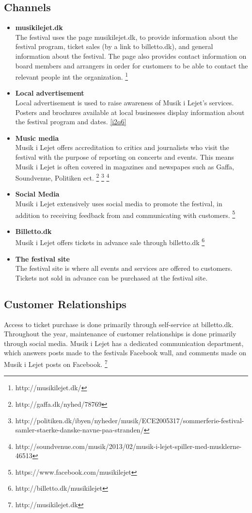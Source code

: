 \subsection{Channels} %
\label{sub:channels}
\begin{itemize}
	\item \textbf{musikilejet.dk}\\
		The festival uses the page musikilejet.dk, to provide information about the festival program, ticket sales (by a link to billetto.dk), and general information about the festival. The page also provides contact information on board members and arrangers in order for customers to be able to contact the relevant people int the organization.
		\footnote{http://musikilejet.dk/}
	\item \textbf{Local advertisement}\\
		Local advertisement is used to raise awareness of Musik i Lejet's services. Posters and brochures available at local businesses display information about the festival program and dates. \ref{i2q6}
	\item \textbf{Music media}\\
		Musik i Lejet offers accreditation to critics and journalists who visit the festival with the purpose of reporting on concerts and events. This means Musik i Lejet is often covered in magazines and newspapes such as Gaffa, Soundvenue, Politiken ect. \footnote{http://gaffa.dk/nyhed/78769}  \footnote{http://politiken.dk/ibyen/nyheder/musik/ECE2005317/sommerferie-festival-samler-staerke-danske-navne-paa-stranden/}
		\footnote{http://soundvenue.com/musik/2013/02/musik-i-lejet-spiller-med-musklerne-46513}
	\item \textbf{Social Media}\\
		Musik i Lejet extensively uses social media to promote the festival, in addition to receiving feedback from and communicating with customers. \footnote{https://www.facebook.com/musikilejet}
	\item \textbf{Billetto.dk}\\
		Musik i Lejet offers tickets in advance sale through billetto.dk \footnote{http://billetto.dk/musikilejet}
	\item \textbf{The festival site}\\
		The festival site is where all events and services are offered to customers. Tickets not sold in advance can be purchased at the festival site.
\end{itemize}
\subsection{Customer Relationships} %
\label{sub:customer_relationships}
Access to ticket purchase is done primarily through self-service at billetto.dk. Throughout the year, maintenance of customer relationships is done primarily through social media. Musik i Lejet has a dedicated communication department, which answers posts made to the festivals Facebook wall, and comments made on Musik i Lejet posts on Facebook. \footnote{http://musikilejet.dk}

